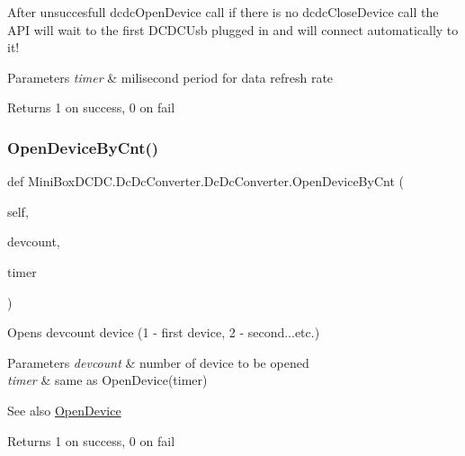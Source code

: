 After unsuccesfull dcdc\+Open\+Device call if there is no dcdc\+Close\+Device call the A\+PI will wait to the first D\+C\+D\+C\+Usb plugged in and will connect automatically to it!


\begin{DoxyParams}{Parameters}
{\em timer} & milisecond period for data refresh rate\\
\hline
\end{DoxyParams}
\begin{DoxyReturn}{Returns}
1 on success, 0 on fail 
\end{DoxyReturn}
\mbox{\label{class_mini_box_d_c_d_c_1_1_dc_dc_converter_1_1_dc_dc_converter_aa2b930875b9c91cbbe295827feb75ce6}} 
\subsubsection{\texorpdfstring{Open\+Device\+By\+Cnt()}{OpenDeviceByCnt()}}
{\footnotesize\ttfamily def Mini\+Box\+D\+C\+D\+C.\+Dc\+Dc\+Converter.\+Dc\+Dc\+Converter.\+Open\+Device\+By\+Cnt (\begin{DoxyParamCaption}\item[{}]{self,  }\item[{}]{devcount,  }\item[{}]{timer }\end{DoxyParamCaption})}



Opens devcount device (1 -\/ first device, 2 -\/ second...etc.) 


\begin{DoxyParams}{Parameters}
{\em devcount} & number of device to be opened \\
\hline
{\em timer} & same as Open\+Device(timer)\\
\hline
\end{DoxyParams}
\begin{DoxySeeAlso}{See also}
\hyperlink{class_mini_box_d_c_d_c_1_1_dc_dc_converter_1_1_dc_dc_converter_a48fc2f6d39793c6e08b1199977f430c2}{Open\+Device}
\end{DoxySeeAlso}
\begin{DoxyReturn}{Returns}
1 on success, 0 on fail 
\end{DoxyReturn}
\mbox{\label{class_mini_box_d_c_d_c_1_1_dc_dc_converter_1_1_dc_dc_converter_adedbbe0014ebc27f0c5dc07a3bdddeff}} 
